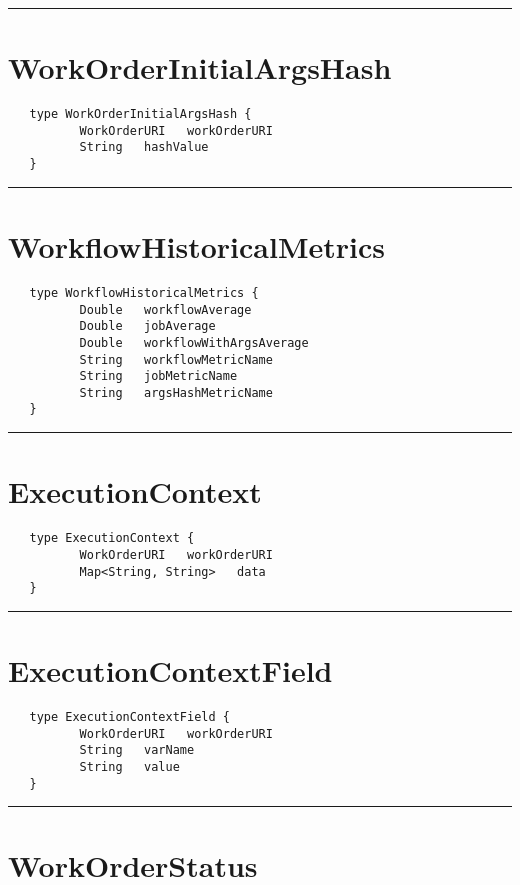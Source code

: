 \rule{12cm}{2pt}
\section{WorkOrderInitialArgsHash}
\label{type:WorkOrderInitialArgsHash}

\begin{Verbatim}
   type WorkOrderInitialArgsHash {
          WorkOrderURI   workOrderURI
          String   hashValue
   }
\end{Verbatim}

\rule{12cm}{2pt}
\section{WorkflowHistoricalMetrics}
\label{type:WorkflowHistoricalMetrics}

\begin{Verbatim}
   type WorkflowHistoricalMetrics {
          Double   workflowAverage
          Double   jobAverage
          Double   workflowWithArgsAverage
          String   workflowMetricName
          String   jobMetricName
          String   argsHashMetricName
   }
\end{Verbatim}

\rule{12cm}{2pt}
\section{ExecutionContext}
\label{type:ExecutionContext}

\begin{Verbatim}
   type ExecutionContext {
          WorkOrderURI   workOrderURI
          Map<String, String>   data
   }
\end{Verbatim}

\rule{12cm}{2pt}
\section{ExecutionContextField}
\label{type:ExecutionContextField}

\begin{Verbatim}
   type ExecutionContextField {
          WorkOrderURI   workOrderURI
          String   varName
          String   value
   }
\end{Verbatim}

\rule{12cm}{2pt}
\section{WorkOrderStatus}
\label{type:WorkOrderStatus}

